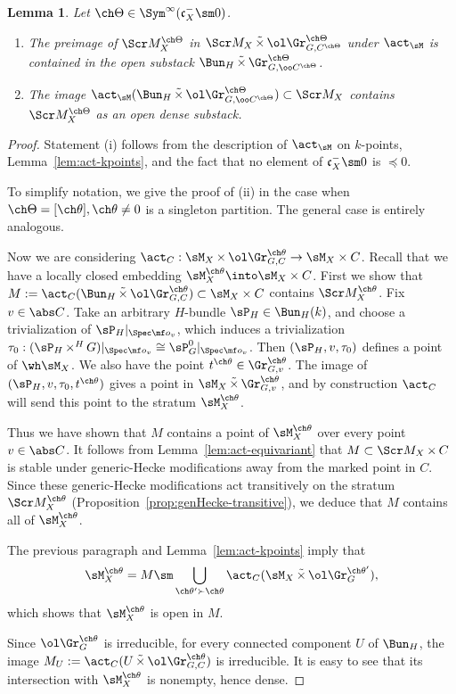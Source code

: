 \documentclass[final]{amsart}
\newtheorem{lem}[subsubsection]{Lemma}
\theoremstyle{remark}
\theoremstyle{definition}
\DeclareMathOperator*{\ttimes}{\tilde\times}
\DeclareMathOperator*{\xt}{\times}
\numberwithin{equation}{section}
\begin{document}
\begin{lem} \label{lem:actimage} 
Let $\ch\Theta \in \Sym^\infty(\mathfrak c_X^- \sm 0)$. 
\begin{enumerate}
\item
The preimage of $\Scr M^{\ch\Theta}_X$ in 
$\Scr M_{X} \ttimes \ol\Gr^{\ch\Theta}_{G,C^{\ch\Theta}}$ 
under $\act_\sM$ 
is contained in the open substack
$\Bun_H \ttimes \Gr^{\ch\Theta}_{G,\oo C^{\ch\Theta}}$. 

\item
The image $\act_\sM(\Bun_H \ttimes \ol\Gr^{\ch\Theta}_{G,\oo C^{\ch\Theta}}) \subset \Scr M_X$ contains $\Scr M_X^{\ch\Theta}$ as an open dense substack. 
\end{enumerate}
\end{lem}
\begin{proof}
Statement (i) follows from the description of
$\act_\sM$ on $k$-points, Lemma~\ref{lem:act-kpoints}, and the fact that no element of $\mathfrak c_X^- \sm 0$ is $ \preceq 0 $. 

To simplify notation, we give the proof of (ii) in the case when
 $\ch\Theta = [\ch\theta], \ch\theta\ne 0$ is a singleton partition. 
The general case is entirely analogous.

Now we are considering $\act_C : \sM_X \xt \ol\Gr^{\ch\theta}_{G,C} \to \sM_X \times C$. 
Recall that we have a 
locally closed embedding $\sM_X^{\ch\theta} \into \sM_X \times C$. 
First we show that 
$M:=\act_C(\Bun_H \ttimes \ol\Gr^{\ch\theta}_{G,C}) \subset \sM_X\times C$ contains 
$\Scr M^{\ch\theta}_X$.
Fix $v\in \abs C$. 
Take an arbitrary $H$-bundle $\sP_H \in \Bun_H(k)$, 
and choose a trivialization of $\sP_H|_{\Spec \mf o_v}$, which 
induces a trivialization $\tau_0 : (\sP_H \xt^H G)|_{\Spec \mf o_v} \cong \sP_G^0|_{\Spec \mf o_v}$. 
Then $(\sP_H,v,\tau_0)$ defines a point of $\wh\sM_X$. 
We also have the point $t^{\ch\theta} \in \Gr^{\ch\theta}_{G,v}$. 
The image of $(\sP_H,v,\tau_0, t^{\ch\theta})$ gives a point in 
$\sM_X \ttimes \Gr^{\ch\theta}_{G,v}$,
and by construction $\act_C$ will send this point to the stratum $\sM^{\ch\theta}_X$.

Thus we have shown that  
$M$ contains a point of $\sM^{\ch\theta}_X$ over every point $v\in \abs C$. 
It follows from Lemma~\ref{lem:act-equivariant} that 
$M \subset \Scr M_X \xt C$ 
is stable under
generic-Hecke modifications away from the marked point in $C$. 
Since these generic-Hecke modifications act transitively on 
the stratum $\Scr M^{\ch\theta}_X$ (Proposition~\ref{prop:genHecke-transitive}), we 
deduce that $M$ contains all of $\sM^{\ch\theta}_X$. 

The previous paragraph and Lemma~\ref{lem:act-kpoints} imply that 
\[ \sM_X^{\ch\theta} = M \sm \bigcup_{\ch\theta' \succ \ch\theta} \act_C(\sM_X \ttimes \ol\Gr^{\ch\theta'}_G), \] 
which shows that $\sM_X^{\ch\theta}$ is open in $M$. 


Since $\ol\Gr^{\ch\theta}_G$ is irreducible, 
for every connected component $U$ of $\Bun_H$, 
the image $M_U := \act_C(U \ttimes \ol\Gr^{\ch\theta}_{G,C})$ is 
irreducible. 
It is easy to see that its intersection with 
$\sM_X^{\ch\theta}$ is nonempty, hence dense. 
\end{proof}
\end{document}
